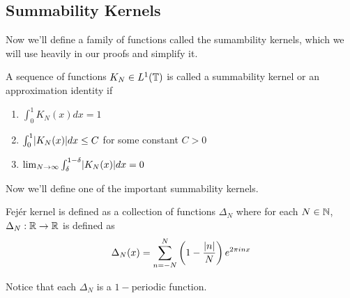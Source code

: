   \subsection{Summability Kernels}
  Now we'll define a family of functions called the sumambility kernels, which we will use heavily in our proofs and simplify it.
  \begin{definition}
    \label{def:summability_kernel}
    A sequence of functions $K_N \in L^1(\mathbb T)$ is called a summability kernel or an approximation identity if 
    \begin{enumerate}[label=(\alph*)]
      \item $\int_{0}^{1}K_N(x)dx = 1$
      \item $\int_{0}^{1}\lvert K_N(x)\rvert dx \le C$ for some constant $C>0$
      \item $\lim_{N\to\infty} \int_{\delta}^{1-\delta}\lvert K_N(x)\rvert dx= 0$
    \end{enumerate}
  \end{definition}
 

  Now we'll define one of the important summability kernels.
  \begin{definition}
    \label{def:fejer_kernel}
    Fej\'er kernel is defined as a collection of functions  $\Delta_N$ where for each $N \in \mathbb N$, $\Delta_N : \mathbb R \to \mathbb R$ is defined as 
    \begin{displaymath}
      \Delta_N(x) = \sum_{n=-N}^{N}\left( 1 - \frac{\lvert n\rvert}{N}\right)e^{2\pi inx}
    \end{displaymath}
  \end{definition}
  Notice that each $\Delta_N$ is a $1-$periodic function.

